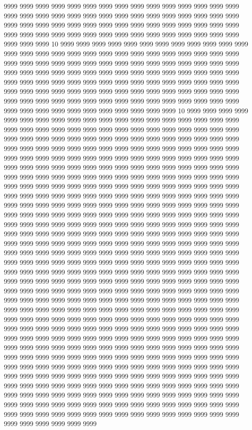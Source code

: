 9999 9999 9999 9999 9999 9999 9999 9999 9999 9999 9999 9999 9999 9999 9999 9999 9999 9999 9999 9999 9999 9999 9999 9999 9999 9999 9999 9999 9999 9999 9999 9999 9999 9999 9999 9999 9999 9999 9999 9999 9999 9999 9999 9999 9999 9999 9999 9999 9999 9999 9999 9999 9999 9999 9999 9999 9999 9999 9999 9999 9999 9999 9999 10 9999 9999 9999 9999 9999 9999 9999 9999 9999 9999 9999 9999 9999 9999 9999 9999 9999 9999 9999 9999 9999 9999 9999 9999 9999 9999 9999 9999 9999 9999 9999 9999 9999 9999 9999 9999 9999 9999 9999 9999 9999 9999 9999 9999 9999 9999 9999 9999 9999 9999 9999 9999 9999 9999 9999 9999 9999 9999 9999 9999 9999 9999 9999 9999 9999 9999 9999 9999 9999 9999 9999 9999 9999 9999 9999 9999 9999 9999 9999 9999 9999 9999 9999 9999 9999 9999 9999 9999 9999 9999 9999 9999 9999 9999 9999 9999 9999 9999 9999 9999 9999 9999 9999 9999 9999 9999 9999 9999 9999 9999 9999 9999 9999 10 9999 9999 9999 9999 9999 9999 9999 9999 9999 9999 9999 9999 9999 9999 9999 9999 9999 9999 9999 9999 9999 9999 9999 9999 9999 9999 9999 9999 9999 9999 9999 9999 9999 9999 9999 9999 9999 9999 9999 9999 9999 9999 9999 9999 9999 9999 9999 9999 9999 9999 9999 9999 9999 9999 9999 9999 9999 9999 9999 9999 9999 9999 9999 9999 9999 9999 9999 9999 9999 9999 9999 9999 9999 9999 9999 9999 9999 9999 9999 9999 9999 9999 9999 9999 9999 9999 9999 9999 9999 9999 9999 9999 9999 9999 9999 9999 9999 9999 9999 9999 9999 9999 9999 9999 9999 9999 9999 9999 9999 9999 9999 9999 9999 9999 9999 9999 9999 9999 9999 9999 9999 9999 9999 9999 9999 9999 9999 9999 9999 9999 9999 9999 9999 9999 9999 9999 9999 9999 9999 9999 9999 9999 9999 9999 9999 9999 9999 9999 9999 9999 9999 9999 9999 9999 9999 9999 9999 9999 9999 9999 9999 9999 9999 9999 9999 9999 9999 9999 9999 9999 9999 9999 9999 9999 9999 9999 9999 9999 9999 9999 9999 9999 9999 9999 9999 9999 9999 9999 9999 9999 9999 9999 9999 9999 9999 9999 9999 9999 9999 9999 9999 9999 9999 9999 9999 9999 9999 9999 9999 9999 9999 9999 9999 9999 9999 9999 9999 9999 9999 9999 9999 9999 9999 9999 9999 9999 9999 9999 9999 9999 9999 9999 9999 9999 9999 9999 9999 9999 9999 9999 9999 9999 9999 9999 9999 9999 9999 9999 9999 9999 9999 9999 9999 9999 9999 9999 9999 9999 9999 9999 9999 9999 9999 9999 9999 9999 9999 9999 9999 9999 9999 9999 9999 9999 9999 9999 9999 9999 9999 9999 9999 9999 9999 9999 9999 9999 9999 9999 9999 9999 9999 9999 9999 9999 9999 9999 9999 9999 9999 9999 9999 9999 9999 9999 9999 9999 9999 9999 9999 9999 9999 9999 9999 9999 9999 9999 9999 9999 9999 9999 9999 9999 9999 9999 9999 9999 9999 9999 9999 9999 9999 9999 9999 9999 9999 9999 9999 9999 9999 9999 9999 9999 9999 9999 9999 9999 9999 9999 9999 9999 9999 9999 9999 9999 9999 9999 9999 9999 9999 9999 9999 9999 9999 9999 9999 9999 9999 9999 9999 9999 9999 9999 9999 9999 9999 9999 9999 9999 9999 9999 9999 9999 9999 9999 9999 9999 9999 9999 9999 9999 9999 9999 9999 9999 9999 9999 9999 9999 9999 9999 9999 9999 9999 9999 9999 9999 9999 9999 9999 9999 9999 9999 9999 9999 9999 9999 9999 9999 9999 9999 9999 9999 9999 9999 9999 9999 9999 9999 9999 9999 9999 9999 9999 9999 9999 9999 9999 9999 9999 9999 9999 9999 9999 9999 9999 9999 9999 9999 9999 9999 9999 9999 9999 9999 9999 9999 9999 9999 9999 9999 9999 9999 9999 9999 9999 9999 9999 9999 9999 9999 9999 9999 9999 9999 9999 9999 9999 9999 9999 9999 9999 9999 9999 9999 9999 9999 9999 9999 9999 9999 